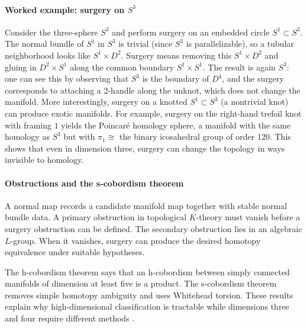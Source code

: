 \paragraph{Worked example: surgery on $S^3$}
Consider the three-sphere $S^3$ and perform surgery on an embedded circle $S^1\subset S^3$. The normal bundle of $S^1$ in $S^3$ is trivial (since $S^3$ is parallelizable), so a tubular neighborhood looks like $S^1\times D^2$. Surgery means removing this $S^1\times D^2$ and gluing in $D^2\times S^1$ along the common boundary $S^1\times S^1$. The result is again $S^3$: one can see this by observing that $S^3$ is the boundary of $D^4$, and the surgery corresponds to attaching a 2-handle along the unknot, which does not change the manifold. More interestingly, surgery on a knotted $S^1\subset S^3$ (a nontrivial knot) can produce exotic manifolds. For example, surgery on the right-hand trefoil knot with framing $1$ yields the Poincaré homology sphere, a manifold with the same homology as $S^3$ but with $\pi_1\cong$ the binary icosahedral group of order 120. This shows that even in dimension three, surgery can change the topology in ways invisible to homology.

\paragraph{Obstructions and the s-cobordism theorem}
A normal map records a candidate manifold map together with stable normal bundle data. A primary obstruction in topological $K$-theory must vanish before a surgery obstruction can be defined. The secondary obstruction lies in an algebraic $L$-group. When it vanishes, surgery can produce the desired homotopy equivalence under suitable hypotheses.

The h-cobordism theorem says that an h-cobordism between simply connected manifolds of dimension at least five is a product. The s-cobordism theorem removes simple homotopy ambiguity and uses Whitehead torsion. These results explain why high-dimensional classification is tractable while dimensions three and four require different methods \cite{surgery_ref4}.

